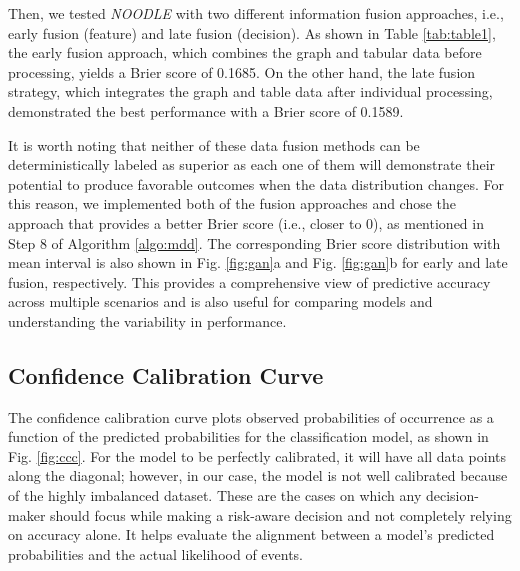 Then, we tested \textit{NOODLE} with two different information fusion approaches, i.e., early fusion (feature) and late fusion (decision). As shown in Table \ref{tab:table1}, the early fusion approach, which combines the graph and tabular data before processing, yields a Brier score of 0.1685. On the other hand, the late fusion strategy, which integrates the graph and table data after individual processing, demonstrated the best performance with a Brier score of 0.1589.

It is worth noting that neither of these data fusion methods can be deterministically labeled as superior \cite{gallo2017multimodal} as each one of them will demonstrate their potential to produce favorable outcomes when the data distribution changes. For this reason, we implemented both of the fusion approaches and chose the approach that provides a better Brier score (i.e., closer to 0), as mentioned in Step 8 of Algorithm \ref{algo:mdd}. The corresponding Brier score distribution with mean interval is also shown in Fig. \ref{fig:gan}a and Fig. \ref{fig:gan}b for early and late fusion, respectively. This provides a comprehensive view of predictive accuracy across multiple scenarios and is also useful for comparing models and understanding the variability in performance.




\subsection*{Confidence Calibration Curve}
The confidence calibration curve %
plots observed probabilities of occurrence as a function of the predicted probabilities for the classification model, as shown in Fig. \ref{fig:ccc}. For the model to be perfectly calibrated, it will have all data points along the diagonal; however, in our case, the model is not well calibrated because of the highly imbalanced dataset. These are the cases on which any decision-maker should focus while making a risk-aware decision and not completely relying on accuracy alone. It helps evaluate the alignment between a model's predicted probabilities and the actual likelihood of events.

